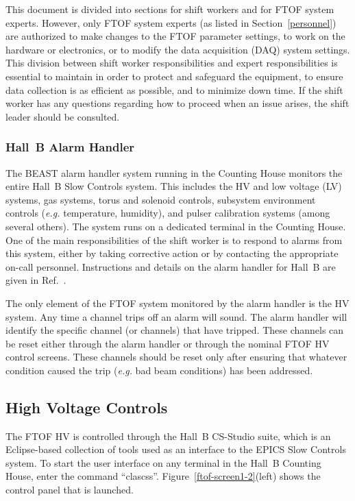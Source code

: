 \documentclass[12pt]{article}
\begin{document}
This document is divided into sections for shift workers and for FTOF system experts. 
However, only FTOF system experts (as listed in Section~\ref{personnel}) are authorized 
to make changes to the FTOF parameter settings, to work on the hardware or electronics, 
or to modify the data acquisition (DAQ) system settings. This division between shift worker
responsibilities and expert responsibilities is essential to maintain in order to protect
and safeguard the equipment, to ensure data collection is as efficient as possible, and to
minimize down time. If the shift worker has any questions regarding how to proceed when an
issue arises, the shift leader should be consulted.

\subsubsection{Hall~B Alarm Handler}
\label{alarms}

The BEAST alarm handler system running in the Counting House monitors the entire 
Hall~B Slow Controls system. This includes the HV and low voltage (LV) systems, gas 
systems, torus and solenoid controls, subsystem environment controls ({\it e.g.}
temperature, humidity), and pulser calibration systems (among several others). The system
runs on a dedicated terminal in the Counting House. One of the main responsibilities of the
shift worker is to respond to alarms from this system, either by taking corrective action
or by contacting the appropriate on-call personnel. Instructions and details on the alarm 
handler for Hall~B are given in Ref.~\cite{beast}.

The only element of the FTOF system monitored by the alarm handler is the HV system. 
Any time a channel trips off an alarm will sound. The alarm handler will identify the 
specific channel (or channels) that have tripped. These channels can be reset either 
through the alarm handler or through the nominal FTOF HV control screens. These channels 
should be reset only after ensuring that whatever condition caused the trip ({\it e.g.}
bad beam conditions) has been addressed.

\subsection{High Voltage Controls}
\label{hv-control}

The FTOF HV is controlled through the Hall~B CS-Studio suite, which is an Eclipse-based 
collection of tools used as an interface to the EPICS Slow Controls system. To start the 
user interface on any terminal in the Hall~B Counting House, enter the command ``clascss''.
Figure~\ref{ftof-screen1-2}(left) shows the control panel that is launched.
\end{document}
